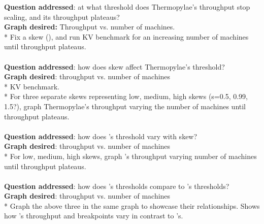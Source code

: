 \textbf{Question addressed}: at what threshold does Thermopylae's throughput stop scaling, and its throughput plateaus?\\
\textbf{Graph desired:} Throughput vs. number of machines.\\
* Fix a skew (), and run KV benchmark for an increasing number of machines until throughput plateaus.\\
\\
\textbf{Question addressed}: how does skew affect Thermopylae's threshold?\\
\textbf{Graph desired}: throughput vs. number of machines\\
* KV benchmark.\\
* For three separate skews representing low, medium, high skews (s=0.5, 0.99, 1.5?), graph Thermopylae's throughput varying the number of machines until throughput plateaus.\\
\\
\textbf{Question addressed}: how does \dsdb{}'s threshold vary with skew?\\
\textbf{Graph desired}: throughput vs. number of machines\\
* For low, medium, high skews, graph \dsdb{}'s throughput varying number of machines until throughput plateaus.\\
\\
\textbf{Question addressed}: how does \name{}'s thresholds compare to \dsdb{}'s thresholds?\\
\textbf{Graph desired}: throughput vs. number of machines\\
* Graph the above three in the same graph to showcase their relationships. Shows how \name{}'s throughput and breakpoints vary in contrast to \dsdb{}'s.

